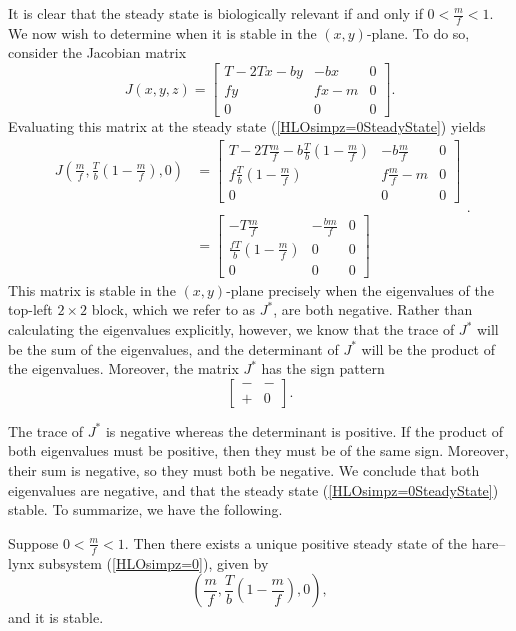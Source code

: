 \documentclass[12pt]{UOthesis}
\theoremstyle{remarkstyle}
\begin{document}
It is clear that the steady state is biologically relevant if and only if $0<\frac{m}{f}<1$. We now wish to determine when it is stable in the $(x,y)$-plane. To do so, consider the Jacobian matrix
$$J(x,y,z)=\begin{bmatrix}
	T-2Tx -by & -bx & 0\\
	fy & fx-m & 0\\
	0 & 0 & 0
\end{bmatrix}.$$
Evaluating this matrix at the steady state (\ref{HLOsimpz=0SteadyState}) yields
\begin{equation*}
	\begin{split}
	J\left(\frac{m}{f}, \frac{T}{b}\left(1-\frac{m}{f}\right),0\right)&=\begin{bmatrix}
		T-2T\frac{m}{f} -b\frac{T}{b}\left(1-\frac{m}{f}\right) & -b\frac{m}{f} & 0\\
		f\frac{T}{b}\left(1-\frac{m}{f}\right) & f\frac{m}{f}-m & 0\\
		0 & 0 & 0
	\end{bmatrix}\\ \\
	&=\begin{bmatrix}
		-T\frac{m}{f} &  -\frac{bm}{f} & 0\\
		\frac{fT}{b}\left(1-\frac{m}{f}\right) & 0 & 0\\
		0 & 0 & 0
	\end{bmatrix}
	\end{split}.
\end{equation*}
This matrix is stable in the $(x,y)$-plane precisely when the eigenvalues of the top-left $2\times 2$ block, which we refer to as $J^*$, are both negative. Rather than calculating the eigenvalues explicitly, however, we know that the trace of $J^*$ will be the sum of the eigenvalues, and the determinant of $J^*$ will be the product of the eigenvalues. Moreover, the matrix $J^*$ has the sign pattern
$$\begin{bmatrix}
	- & -\\
	+ & 0
\end{bmatrix}.$$

The trace of $J^*$ is negative whereas the determinant is positive. If the product of both eigenvalues must be positive, then they must be of the same sign. Moreover, their sum is negative, so they must both be negative. We conclude that both eigenvalues are negative, and that the steady state (\ref{HLOsimpz=0SteadyState}) stable. To summarize, we have the following.

\begin{theo}
	Suppose $0<\frac{m}{f}<1$. Then there exists a unique positive steady state of the hare--lynx subsystem (\ref{HLOsimpz=0}), given by
	\begin{equation}
	\left(\frac{m}{f}, \frac{T}{b}\left(1-\frac{m}{f}\right),0\right),
	\label{HOSubStbCoexPt}
	\end{equation}
	and it is stable.
	\label{TheoremHLOSimpHLCoex}
\end{theo}
\end{document}
